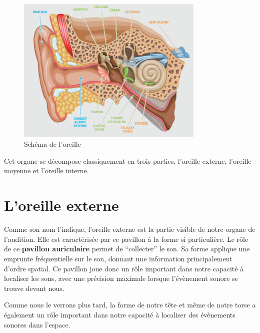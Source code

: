 \documentclass[
  letterpaper,
  DIV=11,
  numbers=noendperiod]{scrreprt}
\begin{document}
\begin{figure}

{\centering \includegraphics[width=0.8\textwidth,height=\textheight]{generalites/../_resources/bitmap/anatomie/anatomie-oreille.jpeg}

}

\caption{\label{fig-oreille}Schéma de l'oreille}

\end{figure}

Cet organe se décompose classiquement en trois parties, l'oreille
externe, l'oreille moyenne et l'oreille interne.

\hypertarget{loreille-externe}{%
\section{L'oreille externe}\label{loreille-externe}}

Comme son nom l'indique, l'oreille externe est la partie visible de
notre organe de l'audition. Elle est caractérisée par ce pavillon à la
forme si particulière. Le rôle de ce \textbf{pavillon auriculaire}
permet de ``collecter'' le son. Sa forme applique une emprunte
fréquentielle sur le son, donnant une information principalement d'ordre
spatial. Ce pavillon joue donc un rôle important dans notre capacité à
localiser les sons, avec une précision maximale lorsque l'évènement
sonore se trouve devant nous.

\begin{tcolorbox}[enhanced jigsaw, leftrule=.75mm, arc=.35mm, bottomtitle=1mm, colback=white, colbacktitle=quarto-callout-note-color!10!white, opacityback=0, left=2mm, rightrule=.15mm, opacitybacktitle=0.6, breakable, toptitle=1mm, titlerule=0mm, bottomrule=.15mm, toprule=.15mm, coltitle=black, title=\textcolor{quarto-callout-note-color}{\faInfo}\hspace{0.5em}{Note}]

Comme nous le verrons plus tard, la forme de notre tête et même de notre
torse a également un rôle important dans notre capacité à localiser des
évènements sonores dans l'espace.

\end{tcolorbox}
\end{document}
